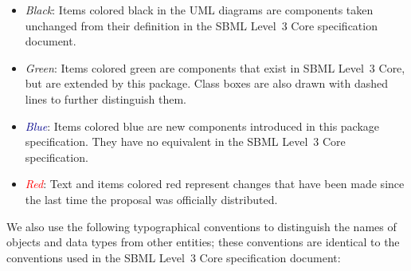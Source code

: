 \begin{itemize}

\item[\raisebox{2.75pt}{\colorbox{black}{\rule{0.8pt}{0.8pt}}}]
\emph{Black}: Items colored black in the UML diagrams are components
taken unchanged from their definition in the SBML Level~3 Core
specification document.

\item[\raisebox{2.75pt}{\colorbox{mediumgreen}{\rule{0.8pt}{0.8pt}}}]
\emph{\textcolor{mediumgreen}{Green}}: Items colored green are
components that exist in SBML Level~3 Core, but are extended by this
package. Class boxes are also drawn with dashed lines to further
distinguish them.

\item[\raisebox{2.75pt}{\colorbox{darkblue}{\rule{0.8pt}{0.8pt}}}]
\emph{\textcolor{darkblue}{Blue}}: Items colored blue are new components
introduced in this package specification. They have no equivalent in the
SBML Level~3 Core specification.

\item[\raisebox{2.75pt}{\colorbox{red}{\rule{0.8pt}{0.8pt}}}]
\emph{\textcolor{red}{Red}}: Text and items colored red represent changes that have been made since the last time the proposal was officially distributed.


\end{itemize}

We also use the following typographical conventions to distinguish the
names of objects and data types from other entities; these conventions
are identical to the conventions used in the SBML Level~3 Core
specification document:

